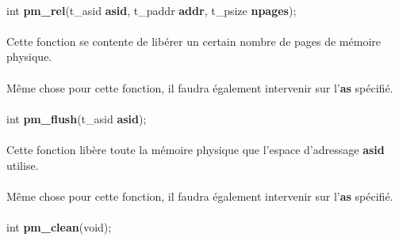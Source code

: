 \documentclass[10pt,a4wide]{article}
\begin{document}
\paragraph{}

\hspace{1.5cm}int \textbf{pm\_rel}(t\_asid \textbf{asid},
                                   t\_paddr \textbf{addr},
                                   t\_psize \textbf{npages});

\paragraph{}

Cette fonction se contente de lib\'erer un certain nombre
de pages de m\'emoire physique.

\paragraph{}

M\^eme chose pour cette fonction, il faudra \'egalement intervenir sur
l'\textbf{as} sp\'ecifi\'e.

\paragraph{}

\hspace{1.5cm}int \textbf{pm\_flush}(t\_asid \textbf{asid});

\paragraph{}

Cette fonction lib\`ere toute la m\'emoire physique que l'espace d'adressage
\textbf{asid} utilise.

\paragraph{}

M\^eme chose pour cette fonction, il faudra \'egalement intervenir sur
l'\textbf{as} sp\'ecifi\'e.

\paragraph{}

\hspace{1.5cm}int \textbf{pm\_clean}(void);

\paragraph{}
\end{document}
